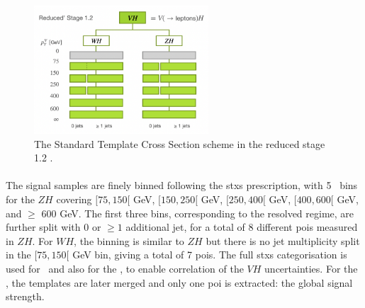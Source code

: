 \begin{figure}[!htbp]
    \centering
    \includegraphics[width=0.58\textwidth]{Images/VH/Model/STXSsketch.png}
    \caption{The Standard Template Cross Section scheme in the reduced stage 1.2 \cite{berger2019simplified}.}
    \label{fig:model-stxsscheme}
\end{figure}

\paragraph{}The signal samples are finely binned following the \gls{stxs} prescription, with 5 \ptv\ bins for the $ZH$ covering $[75, 150[$ GeV, $[150, 250[$ GeV, $[250, 400[$ GeV, $[400, 600[$ GeV, and $\geq$ 600 GeV. The first three bins, corresponding to the resolved regime, are further split  with 0 or $\geq 1$ additional jet, for a total of 8 different \glspl{poi} measured in $ZH$. For $WH$, the binning is similar to $ZH$ but there is no jet multiplicity split in the $[75, 150[$ GeV bin, giving a total of 7 \glspl{poi}. The full \gls{stxs} categorisation is used for \vhb\ and also for the \vhc, to enable correlation of the $VH$ uncertainties. For the \vhc, the templates are later merged and only one \gls{poi} is extracted: the global signal strength.\\
  

